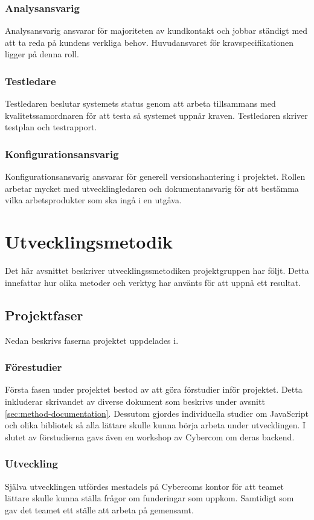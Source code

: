 \subsubsection*{Analysansvarig}
Analysansvarig ansvarar för majoriteten av kundkontakt och jobbar ständigt med att ta reda på kundens verkliga behov. Huvudansvaret för kravspecifikationen ligger på denna roll.

\subsubsection*{Testledare}
Testledaren beslutar systemets status genom att arbeta tillsammans med kvalitetssamordnaren för att testa så systemet uppnår kraven. Testledaren skriver testplan och testrapport.

\subsubsection*{Konfigurationsansvarig}
Konfigurationsansvarig ansvarar för generell versionshantering i projektet. Rollen arbetar mycket med utvecklingledaren och dokumentansvarig för att bestämma vilka arbetsprodukter som ska ingå i en utgåva.

\section{Utvecklingsmetodik}
Det här avsnittet beskriver utvecklingssmetodiken projektgruppen har följt. Detta innefattar hur olika metoder och verktyg har använts för att uppnå ett resultat.

\subsection{Projektfaser}
Nedan beskrivs faserna projektet uppdelades i.

\subsubsection*{Förestudier}
Första fasen under projektet bestod av att göra förstudier inför projektet. Detta inkluderar skrivandet av diverse dokument som beskrivs under avsnitt \ref{sec:method-documentation}. Dessutom gjordes individuella studier om JavaScript och olika bibliotek så alla lättare skulle kunna börja arbeta under utvecklingen. I slutet av förstudierna gavs även en workshop av Cybercom om deras backend.

\subsubsection*{Utveckling}
Själva utvecklingen utfördes mestadels på Cybercoms kontor för att teamet lättare skulle kunna ställa frågor om funderingar som uppkom. Samtidigt som gav det teamet ett ställe att arbeta på gemensamt.

